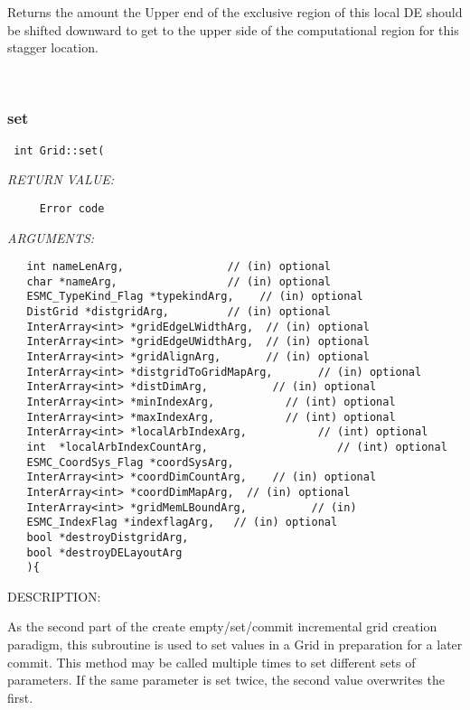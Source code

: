      Returns the amount the Upper end of the exclusive region of
     this local DE should be shifted downward
     to get to the upper side of the computational region for this stagger location.
   
 
\mbox{}\hrulefill\ 
 
\subsubsection [set] {set}


  
\begin{verbatim} int Grid::set(\end{verbatim}{\em RETURN VALUE:}
\begin{verbatim}     Error code\end{verbatim}{\em ARGUMENTS:}
\begin{verbatim}   int nameLenArg,                // (in) optional
   char *nameArg,                 // (in) optional
   ESMC_TypeKind_Flag *typekindArg,    // (in) optional
   DistGrid *distgridArg,         // (in) optional
   InterArray<int> *gridEdgeLWidthArg,  // (in) optional
   InterArray<int> *gridEdgeUWidthArg,  // (in) optional
   InterArray<int> *gridAlignArg,       // (in) optional
   InterArray<int> *distgridToGridMapArg,       // (in) optional
   InterArray<int> *distDimArg,          // (in) optional
   InterArray<int> *minIndexArg,           // (int) optional
   InterArray<int> *maxIndexArg,           // (int) optional
   InterArray<int> *localArbIndexArg,           // (int) optional
   int  *localArbIndexCountArg,                    // (int) optional
   ESMC_CoordSys_Flag *coordSysArg, 
   InterArray<int> *coordDimCountArg,    // (in) optional
   InterArray<int> *coordDimMapArg,  // (in) optional
   InterArray<int> *gridMemLBoundArg,          // (in)
   ESMC_IndexFlag *indexflagArg,   // (in) optional
   bool *destroyDistgridArg,
   bool *destroyDELayoutArg
   ){\end{verbatim}
{\sf DESCRIPTION:\\ }


     As the second part of the create empty/set/commit incremental grid 
    creation paradigm, this subroutine is used to set values in a Grid in
    preparation for  a later commit. This method may be called multiple times 
    to set different sets of parameters. If the same parameter is set twice,
    the second value overwrites the first. 
     
